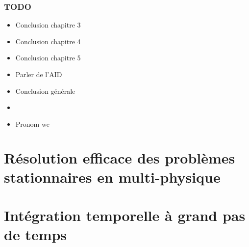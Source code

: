 



\makeflyleaf
{}

\tableofcontents
{}



\section*{TODO}
\begin{itemize}
  \item Conclusion chapitre 3
  \item Conclusion chapitre 4
  \item Conclusion chapitre 5
  \item Parler de l'AID
  \item Conclusion générale
  \item {}
  \item Pronom we
\end{itemize}


\part{Résolution efficace des problèmes stationnaires en multi-physique}

  

  

  

\part{Intégration temporelle à grand pas de temps}

    

    







